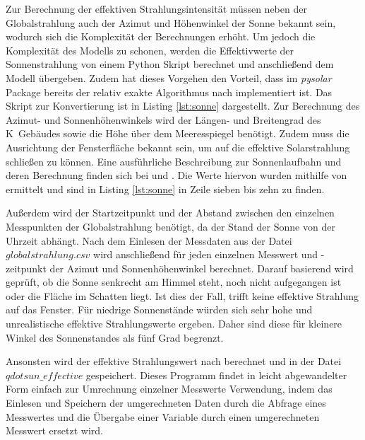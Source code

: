 Zur Berechnung der effektiven Strahlungsintensität müssen neben der Globalstrahlung auch der Azimut und Höhenwinkel der Sonne bekannt sein, wodurch sich die Komplexität der Berechnungen erhöht. Um jedoch die Komplexität des Modells zu schonen, werden die Effektivwerte der Sonnenstrahlung von einem Python Skript berechnet und anschließend dem Modell übergeben. Zudem hat dieses Vorgehen den Vorteil, dass im \textit{pysolar} Package \cite{pysolar} bereits der relativ exakte Algorithmus nach \cite{re08} implementiert ist. 
Das Skript zur Konvertierung ist in Listing \ref{lst:sonne} dargestellt. 
Zur Berechnung des Azimut- und Sonnenhöhenwinkels wird der Längen- und Breitengrad des K~Gebäudes sowie die Höhe über dem Meeresspiegel benötigt. Zudem muss die Ausrichtung der Fensterfläche bekannt sein, um auf die effektive Solarstrahlung schließen zu können. Eine ausführliche Beschreibung zur Sonnenlaufbahn und deren Berechnung finden sich bei \cite{qu11} und \cite{ka13}. Die Werte hiervon wurden mithilfe von \cite{go15} ermittelt und sind in Listing \ref{lst:sonne} in Zeile sieben bis zehn zu finden.



Außerdem wird der Startzeitpunkt und der Abstand zwischen den einzelnen Messpunkten der Globalstrahlung benötigt, da der Stand der Sonne von der Uhrzeit abhängt. Nach dem Einlesen der Messdaten aus der Datei $globalstrahlung.csv$ wird anschließend für jeden einzelnen Messwert und -zeitpunkt der Azimut und Sonnenhöhenwinkel berechnet. Darauf basierend wird geprüft, ob die Sonne senkrecht am Himmel steht, noch nicht aufgegangen ist oder die Fläche im Schatten liegt. Ist dies der Fall, trifft keine effektive Strahlung auf das Fenster. Für niedrige Sonnenstände würden sich sehr hohe und unrealistische effektive Strahlungswerte ergeben. Daher sind diese für kleinere Winkel des Sonnenstandes als fünf Grad begrenzt.

Ansonsten wird der effektive Strahlungswert nach \cite[S.~67f.]{qu11} berechnet und in der Datei $qdotsun\_effective$ gespeichert. Dieses Programm findet in leicht abgewandelter Form einfach zur Umrechnung einzelner Messwerte Verwendung, indem das Einlesen und Speichern der umgerechneten Daten durch die Abfrage eines Messwertes und die Übergabe einer Variable durch einen umgerechneten Messwert ersetzt wird.

